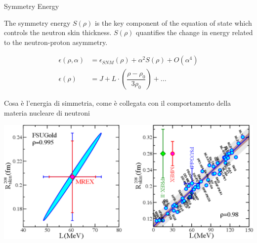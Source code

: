 \documentclass[9pt,a4paper]{beamer}
\begin{document}
\begin{frame}{Symmetry Energy}

The symmetry energy $S(\rho)$ is the key component of the equation of state which controls the neutron skin thickness. $S(\rho)$ quantifies the change in energy related to the neutron-proton asymmetry. 

\begin{equation}
\begin{split}
\epsilon(\rho, \alpha) &= \epsilon_{SNM}(\rho) + \alpha^{2} S(\rho) + O(\alpha^{4}) \\
\epsilon(\rho) &= J + L \cdot (\dfrac{\rho - \rho_{0}}{3 \rho_{0}}) + ...
\end{split}
\end{equation}

Cosa è l'energia di simmetria, come è collegata con il comportamento della materia nucleare di neutroni 

\begin{center}
\includegraphics[scale=0.3]{figures/LvsR.pdf}
\end{center}

\end{frame}
\end{document}
